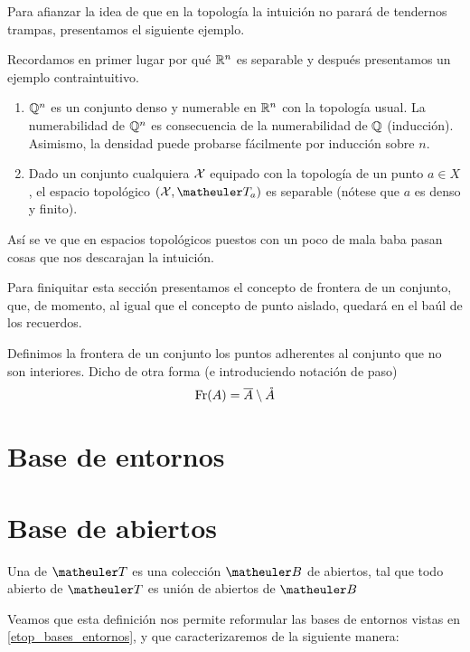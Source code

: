Para afianzar la idea de que en la topología la intuición no parará de tendernos trampas, presentamos el siguiente ejemplo.
\begin{exa}
	Recordamos en primer lugar por qué $\mathbb{R}^n$ es separable y después presentamos un ejemplo contraintuitivo.
	\begin{enumerate}
		\item $\mathbb{Q}^n$ es un conjunto denso y numerable en $\mathbb{R}^n$ con la topología usual. La numerabilidad de $\mathbb{Q}^n$ es consecuencia de la numerabilidad de $\mathbb{Q}$ (inducción). Asimismo, la densidad puede probarse fácilmente por inducción sobre $n$.
		\item Dado un conjunto cualquiera $\mathcal{X}$ equipado con la topología de un punto $a\in X$, el espacio topológico $(\X,\T_a)$ es separable (nótese que $a$ es denso y finito).
	\end{enumerate}
	Así se ve que en espacios topológicos puestos con un poco de mala baba pasan cosas que nos descarajan la intuición.
\end{exa}
Para finiquitar esta sección presentamos el concepto de frontera de un conjunto, que, de momento, al igual que el concepto de punto aislado, quedará en el baúl de los recuerdos.
\begin{defi}
	Definimos la frontera de un conjunto los puntos adherentes al conjunto que no son interiores. Dicho de otra forma (e introduciendo notación de paso)
	\begin{equation}
		\operatorname{\mathrm{Fr}}(A)=\overline{A}\setminus\mathring{A}
	\end{equation}
\end{defi}




\section{Base de entornos}
\begin{defi}
	\label{etop_bases_entornos}
\end{defi}

\section{Base de abiertos}
\begin{defi}
	\label{etop_bases_abiertos}
	Una  de $\T$ es una colección $\B$ de abiertos, tal que todo abierto de $\T$ es unión de abiertos de $\B$
\end{defi}
Veamos que esta definición nos permite reformular las bases de entornos vistas en \eqref{etop_bases_entornos}, y que caracterizaremos de la siguiente manera:


